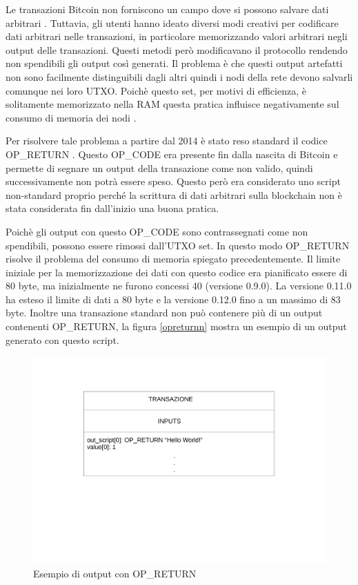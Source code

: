 Le transazioni Bitcoin non forniscono un campo dove si possono salvare dati arbitrari \cite{arbdata}. Tuttavia, gli utenti hanno ideato diversi modi creativi per codificare dati arbitrari nelle transazioni, in particolare memorizzando valori arbitrari negli output delle transazioni. Questi metodi però modificavano il protocollo rendendo non spendibili gli output così generati. Il problema è che questi output artefatti non sono facilmente distinguibili dagli altri quindi i nodi della rete devono salvarli comunque nei loro UTXO.
Poichè questo set, per motivi di efficienza, è solitamente memorizzato nella RAM \cite{utxo} questa pratica influisce negativamente sul consumo di memoria dei nodi \cite{stresstest}.

Per risolvere tale problema a partire dal 2014 è stato reso standard il codice OP\_RETURN \cite{opreturnstandard}. Questo OP\_CODE era presente fin dalla nascita di Bitcoin e permette di segnare un output della transazione come non valido, quindi successivamente non potrà essere speso. Questo però era considerato uno script non-standard proprio perché la scrittura di dati arbitrari sulla blockchain non è stata considerata fin dall'inizio una buona pratica.

Poichè gli output con questo OP\_CODE sono contrassegnati come non spendibili, possono essere rimossi dall'UTXO set. In questo modo OP\_RETURN risolve il problema del consumo di memoria spiegato precedentemente. Il limite iniziale per la memorizzazione dei dati con questo codice era pianificato essere di 80 byte, ma inizialmente ne furono concessi 40 (versione 0.9.0).  La versione 0.11.0 \cite{v11} ha esteso il limite di dati a 80 byte e la versione 0.12.0 \cite{v12} fino a un massimo di 83 byte. Inoltre una transazione standard non può contenere più di un output contenenti OP\_RETURN, la figura \ref{opreturnn} mostra un esempio di un output generato con questo script.
\begin{figure}[h!]
    \centering
    \includegraphics[scale=0.5, trim = 1cm 8cm 0cm 3cm, clip]{Images/opreturnn.pdf}
    \caption{Esempio di output con OP\_RETURN}
    \label{fig:opreturnn}
\end{figure}
\FloatBarrier

